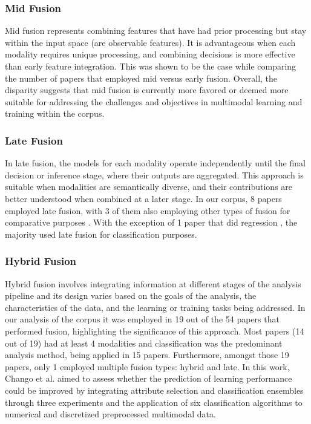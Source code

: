 \documentclass[manuscript,screen,review]{acmart}
\begin{document}
\subsubsection{Mid Fusion}

Mid fusion represents combining features that have had prior processing but stay within the input space (are observable features). It is advantageous when each modality requires unique processing, and combining decisions is more effective than early feature integration. This was shown to be the case while comparing the number of papers that employed mid versus early fusion. Overall, the disparity suggests that mid fusion is currently more favored or deemed more suitable for addressing the challenges and objectives in multimodal learning and training within the corpus. 

\subsubsection{Late Fusion}

In late fusion, the models for each modality operate independently until the final decision or inference stage, where their outputs are aggregated. This approach is suitable when modalities are semantically diverse, and their contributions are better understood when combined at a later stage. In our corpus, 8 papers employed late fusion, with 3 of them also employing other types of fusion for comparative purposes \cite{1315379489,2936220551,4277812050}. With the exception of 1 paper that did regression \cite{2836996318}, the majority used late fusion for classification purposes.
 
\subsubsection{Hybrid Fusion}
Hybrid fusion involves integrating information at different stages of the analysis pipeline and its design varies based on the goals of the analysis, the characteristics of the data, and the learning or training tasks being addressed. In our analysis of the corpus it was employed in 19 out of the 54 papers that performed fusion, highlighting the significance of this approach. Most papers (14 out of 19) had at least 4 modalities and classification was the predominant analysis method, being applied in 15 papers. Furthermore, amongst those 19 papers, only 1 employed multiple fusion types: hybrid and late. In this work, Chango et al. aimed to assess whether the prediction of learning performance could be improved by integrating attribute selection and classification ensembles through three experiments and the application of six classification algorithms to numerical and discretized preprocessed multimodal data\cite{4277812050}. 
\end{document}

